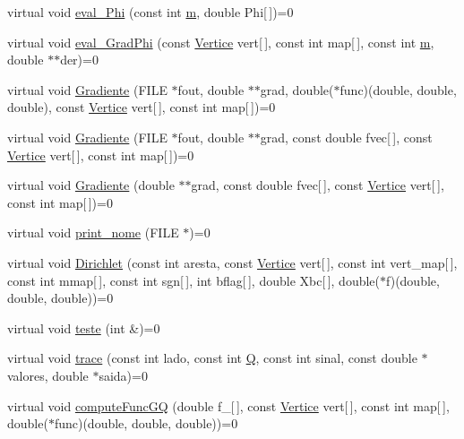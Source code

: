 \begin{DoxyCompactItemize}
\item 
virtual void \hyperlink{classStdel_a2aa6ea12ceaa1fa4a7f63909ce41bc0b}{eval\+\_\+\+Phi} (const int \hyperlink{DG__EI__Header_8h_a742204794ea328ba293fe59cec79b990}{m}, double Phi\mbox{[}$\,$\mbox{]})=0
\item 
virtual void \hyperlink{classStdel_a83a7a53e4be6da7c3a615967e4504b07}{eval\+\_\+\+Grad\+Phi} (const \hyperlink{structVertice}{Vertice} vert\mbox{[}$\,$\mbox{]}, const int map\mbox{[}$\,$\mbox{]}, const int \hyperlink{DG__EI__Header_8h_a742204794ea328ba293fe59cec79b990}{m}, double $\ast$$\ast$der)=0
\item 
virtual void \hyperlink{classStdel_af3e65d1ad0d59ded925a3f5a9d0fb100}{Gradiente} (F\+I\+LE $\ast$fout, double $\ast$$\ast$grad, double($\ast$func)(double, double, double), const \hyperlink{structVertice}{Vertice} vert\mbox{[}$\,$\mbox{]}, const int map\mbox{[}$\,$\mbox{]})=0
\item 
virtual void \hyperlink{classStdel_abf44e457d99e8c559c14cb1f7423da12}{Gradiente} (F\+I\+LE $\ast$fout, double $\ast$$\ast$grad, const double fvec\mbox{[}$\,$\mbox{]}, const \hyperlink{structVertice}{Vertice} vert\mbox{[}$\,$\mbox{]}, const int map\mbox{[}$\,$\mbox{]})=0
\item 
virtual void \hyperlink{classStdel_aec200dfb0b00bebf70a1d845675eeafd}{Gradiente} (double $\ast$$\ast$grad, const double fvec\mbox{[}$\,$\mbox{]}, const \hyperlink{structVertice}{Vertice} vert\mbox{[}$\,$\mbox{]}, const int map\mbox{[}$\,$\mbox{]})=0
\item 
virtual void \hyperlink{classStdel_ac654f45f744ec4cfeab74ed4ded99ef5}{print\+\_\+nome} (F\+I\+LE $\ast$)=0
\item 
virtual void \hyperlink{classStdel_a92e13b000249ba73b35407d925cbd7a8}{Dirichlet} (const int aresta, const \hyperlink{structVertice}{Vertice} vert\mbox{[}$\,$\mbox{]}, const int vert\+\_\+map\mbox{[}$\,$\mbox{]}, const int mmap\mbox{[}$\,$\mbox{]}, const int sgn\mbox{[}$\,$\mbox{]}, int bflag\mbox{[}$\,$\mbox{]}, double Xbc\mbox{[}$\,$\mbox{]}, double($\ast$f)(double, double, double))=0
\item 
virtual void \hyperlink{classStdel_ae62bc70bb31e48d165593ed1ecd482f8}{teste} (int \&)=0
\item 
virtual void \hyperlink{classStdel_aeb2fe03bbd8af61e503e29d3dd5ae4f0}{trace} (const int lado, const int \hyperlink{classStdel_a82074e598ad5af5ec45a3257a3c2b684}{Q}, const int sinal, const double $\ast$valores, double $\ast$saida)=0
\item 
virtual void \hyperlink{classStdel_a59195ad1ce9b90ef83fd935698dc3305}{compute\+Func\+GQ} (double f\+\_\+\mbox{[}$\,$\mbox{]}, const \hyperlink{structVertice}{Vertice} vert\mbox{[}$\,$\mbox{]}, const int map\mbox{[}$\,$\mbox{]}, double($\ast$func)(double, double, double))=0

\end{DoxyCompactItemize}
